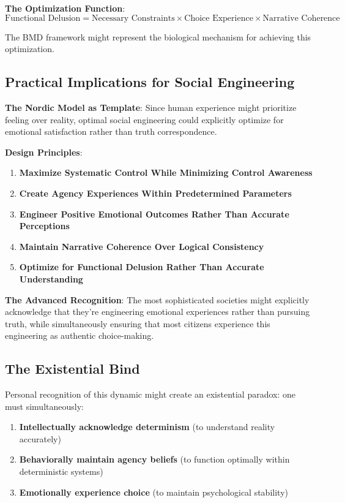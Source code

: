 \documentclass[12pt]{article}
\begin{document}
\textbf{The Optimization Function}:
$$\text{Functional Delusion} = \text{Necessary Constraints} \times \text{Choice Experience} \times \text{Narrative Coherence}$$

The BMD framework might represent the biological mechanism for achieving this optimization.

\subsection{Practical Implications for Social Engineering}

\textbf{The Nordic Model as Template}: Since human experience might prioritize feeling over reality, optimal social engineering could explicitly optimize for emotional satisfaction rather than truth correspondence.

\textbf{Design Principles}:
\begin{enumerate}
\item \textbf{Maximize Systematic Control While Minimizing Control Awareness}
\item \textbf{Create Agency Experiences Within Predetermined Parameters}
\item \textbf{Engineer Positive Emotional Outcomes Rather Than Accurate Perceptions}
\item \textbf{Maintain Narrative Coherence Over Logical Consistency}
\item \textbf{Optimize for Functional Delusion Rather Than Accurate Understanding}
\end{enumerate}

\textbf{The Advanced Recognition}: The most sophisticated societies might explicitly acknowledge that they're engineering emotional experiences rather than pursuing truth, while simultaneously ensuring that most citizens experience this engineering as authentic choice-making.

\subsection{The Existential Bind}

Personal recognition of this dynamic might create an existential paradox: one must simultaneously:
\begin{enumerate}
\item \textbf{Intellectually acknowledge determinism} (to understand reality accurately)
\item \textbf{Behaviorally maintain agency beliefs} (to function optimally within deterministic systems)
\item \textbf{Emotionally experience choice} (to maintain psychological stability)
\end{enumerate}
\end{document}
